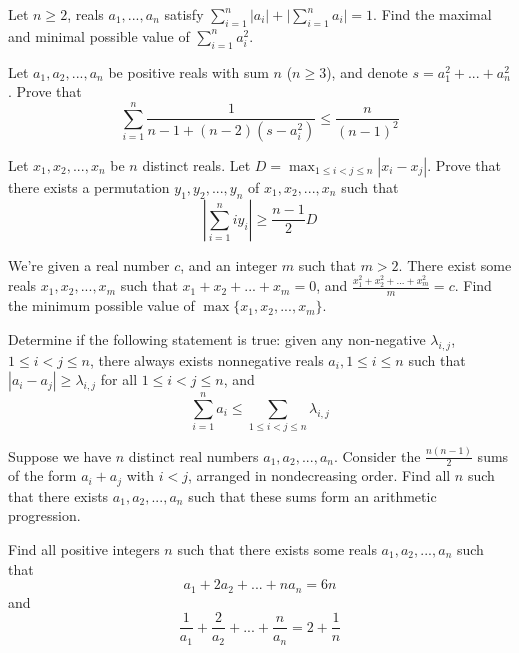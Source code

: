  {Let $n\ge 2$, reals $a_1,...,a_n$ satisfy $\sum_{i=1}^n |a_i| + \lvert \sum_{i=1}^n a_i\rvert = 1$. Find the maximal and minimal possible value of $\sum_{i=1}^n a_i^2$.}

 {Let $a_1,a_2,...,a_n$ be positive reals with sum $n$ ($n\ge 3$), and denote $s=a_1^2+...+a_n^2$. Prove that $$\sum_{i=1}^n \frac{1}{n-1+(n-2)(s-a_i^2)} \le \frac{n}{(n-1)^2}$$}

 {Let $x_1,x_2,...,x_n$ be $n$ distinct reals. Let $D=\max_{1\le i<j\le n} |x_i-x_j|$. Prove that there exists a permutation $y_1,y_2,...,y_n$ of $x_1,x_2,...,x_n$ such that $$\left\lvert \sum_{i=1}^n iy_i \right\rvert \ge \frac{n-1}{2}D $$}

 {We're given a real number $c$, and an integer $m$ such that $m>2$. There exist some reals $x_1, x_2, ..., x_m$ such that $x_1 + x_2 + ... + x_m = 0$, and $\frac{x_1^2+x_2^2+...+x_m^2}m=c$. Find the minimum possible value of $\max\{x_1,x_2,...,x_m\}$.}

 {Determine if the following statement is true: given any non-negative $\lambda_{i,j}$, $1\le i<j\le n$, there always exists nonnegative reals $a_i, 1\le i\le n$ such that $|a_i-a_j|\ge \lambda_{i,j}$ for all $1\le i<j\le n$, and $$\sum_{i=1}^n a_i\le \sum_{1\le i<j\le n}\lambda_{i,j}$$}




 {Suppose we have $n$ distinct real numbers $a_1, a_2,..., a_n$. Consider the $\frac{n(n-1)}{2}$ sums of the form $a_i + a_j$ with $i<j$, arranged in nondecreasing order. Find all $n$ such that there exists $a_1, a_2, ..., a_n$ such that these sums form an arithmetic progression.}

 {Find all positive integers $n$ such that there exists some reals $a_1, a_2, ..., a_n$ such that
    \[a_1 + 2a_2 + ... + na_n = 6n\]
    and
    \[\frac1{a_1}+\frac2{a_2}+...+\frac{n}{a_n}=2+\frac1n\]}



